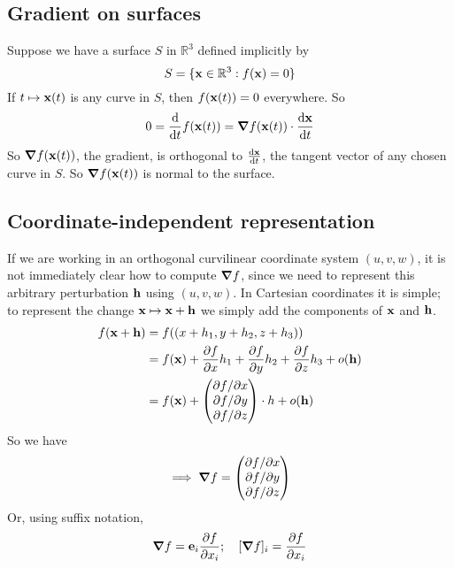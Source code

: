 \subsection{Gradient on surfaces}
Suppose we have a surface \(S\) in \(\mathbb R^3\) defined implicitly by
\[
	S = \{ \vb x \in \mathbb R^3 : f(\vb x) = 0 \}
\]
If \(t \mapsto \vb x(t)\) is any curve in \(S\), then \(f(\vb x(t)) = 0\) everywhere.
So
\[
	0 = \frac{\dd}{\dd{t}}f(\vb x(t)) = \grad f(\vb x(t)) \cdot \frac{\dd \vb x}{\dd{t}}
\]
So \(\grad f(\vb x(t))\), the gradient, is orthogonal to \(\frac{\dd \vb x}{\dd{t}}\), the tangent vector of any chosen curve in \(S\).
So \(\grad f(\vb x(t))\) is normal to the surface.

\subsection{Coordinate-independent representation}
If we are working in an orthogonal curvilinear coordinate system \((u, v, w)\), it is not immediately clear how to compute \(\grad f\), since we need to represent this arbitrary perturbation \(\vb h\) using \((u, v, w)\).
In Cartesian coordinates it is simple; to represent the change \(\vb x \mapsto \vb x + \vb h\) we simply add the components of \(\vb x\) and \(\vb h\).
\begin{align*}
	f(\vb x + \vb h) & = f((x + h_1, y + h_2, z + h_3))                                                                                                  \\
	                 & = f(\vb x) + \frac{\partial f}{\partial x} h_1 + \frac{\partial f}{\partial y} h_2 + \frac{\partial f}{\partial z} h_3 + o(\vb h) \\
	                 & = f(\vb x) + \begin{pmatrix}
		\partial f / \partial x \\ \partial f / \partial y \\ \partial f / \partial z
	\end{pmatrix} \cdot h + o(\vb h)                                                                        \\
\end{align*}
So we have
\[
	\implies \grad f = \begin{pmatrix}
		\partial f / \partial x \\ \partial f / \partial y \\ \partial f / \partial z
	\end{pmatrix}
\]
Or, using suffix notation,
\[
	\grad f = \vb e_i \frac{\partial f}{\partial x_i};\quad [\grad f]_i = \frac{\partial f}{\partial x_i}
\]
